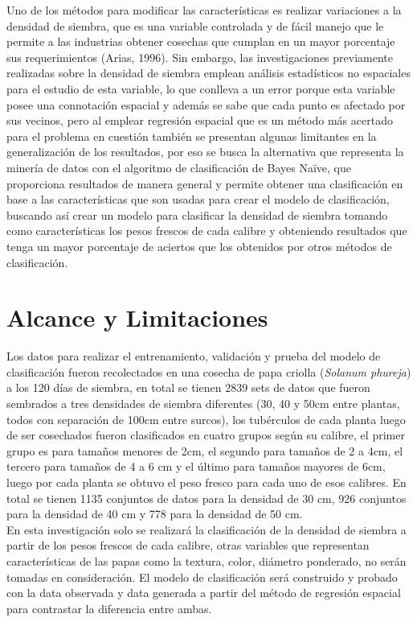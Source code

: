 Uno de los métodos para modificar las características es realizar variaciones a la densidad de siembra, que es una variable controlada y de fácil manejo que le permite a las industrias obtener cosechas que cumplan en un mayor porcentaje sus requerimientos (Arias, 1996). Sin embargo, las investigaciones previamente realizadas sobre la densidad de siembra emplean análisis estadísticos no espaciales para el estudio de esta variable, lo que conlleva a un error porque esta variable posee una connotación espacial y además se sabe que cada punto es afectado por sus vecinos, pero al emplear regresión espacial que es un método más acertado para el problema en cuestión también se presentan algunas limitantes en la generalización de los resultados, por eso se busca la alternativa que representa la minería de datos con el algoritmo de clasificación de Bayes Naïve, que proporciona resultados de manera general y permite obtener una clasificación en base a las características que son usadas para crear el modelo de clasificación, buscando así crear un modelo para clasificar la densidad de siembra tomando como características los pesos frescos de cada calibre y obteniendo resultados que tenga un mayor porcentaje de aciertos que los obtenidos por otros métodos de clasificación.
	
\section{Alcance y Limitaciones}

Los datos para realizar el entrenamiento, validación y prueba del modelo de clasificación fueron recolectados en una cosecha de papa criolla (\textit{Solanum phureja}) a los 120 días de siembra, en total se tienen 2839 sets de datos que fueron sembrados a tres densidades de siembra diferentes (30, 40 y 50cm entre plantas, todos con separación de 100cm entre surcos), los tubérculos de cada planta luego de ser cosechados fueron clasificados en cuatro grupos según su calibre, el primer grupo es para tamaños menores de 2cm, el segundo para tamaños de 2 a 4cm, el tercero para tamaños de 4 a 6 cm y el último para tamaños mayores de 6cm, luego por cada planta se obtuvo el peso fresco para cada uno de esos calibres. En total se tienen 1135 conjuntos de datos para la densidad de 30 cm, 926 conjuntos para la densidad de 40 cm y 778 para la densidad de 50 cm.\\

En esta investigación solo se realizará la clasificación de la densidad de siembra a partir de los pesos frescos de cada calibre, otras variables que representan características de las papas como la textura, color, diámetro ponderado, no serán tomadas en consideración. El modelo de clasificación será construido y probado con la data observada y data generada a partir del método de regresión espacial para contrastar la diferencia entre ambas. 
